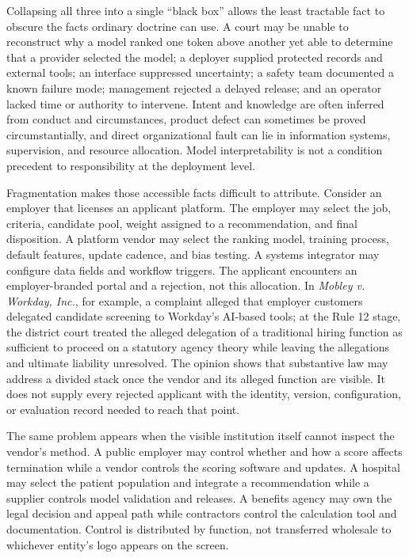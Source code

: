 Collapsing all three into a single ``black box'' allows the least tractable fact to obscure the facts ordinary doctrine can use. A court may be unable to reconstruct why a model ranked one token above another yet able to determine that a provider selected the model; a deployer supplied protected records and external tools; an interface suppressed uncertainty; a safety team documented a known failure mode; management rejected a delayed release; and an operator lacked time or authority to intervene. Intent and knowledge are often inferred from conduct and circumstances, product defect can sometimes be proved circumstantially, and direct organizational fault can lie in information systems, supervision, and resource allocation. Model interpretability is not a condition precedent to responsibility at the deployment level.

Fragmentation makes those accessible facts difficult to attribute. Consider an employer that licenses an applicant platform. The employer may select the job, criteria, candidate pool, weight assigned to a recommendation, and final disposition. A platform vendor may select the ranking model, training process, default features, update cadence, and bias testing. A systems integrator may configure data fields and workflow triggers. The applicant encounters an employer-branded portal and a rejection, not this allocation. In \emph{Mobley v. Workday, Inc.}, for example, a complaint alleged that employer customers delegated candidate screening to Workday's AI-based tools; at the Rule 12 stage, the district court treated the alleged delegation of a traditional hiring function as sufficient to proceed on a statutory agency theory while leaving the allegations and ultimate liability unresolved. The opinion shows that substantive law may address a divided stack once the vendor and its alleged function are visible. It does not supply every rejected applicant with the identity, version, configuration, or evaluation record needed to reach that point.

The same problem appears when the visible institution itself cannot inspect the vendor's method. A public employer may control whether and how a score affects termination while a vendor controls the scoring software and updates. A hospital may select the patient population and integrate a recommendation while a supplier controls model validation and releases. A benefits agency may own the legal decision and appeal path while contractors control the calculation tool and documentation. Control is distributed by function, not transferred wholesale to whichever entity's logo appears on the screen.

